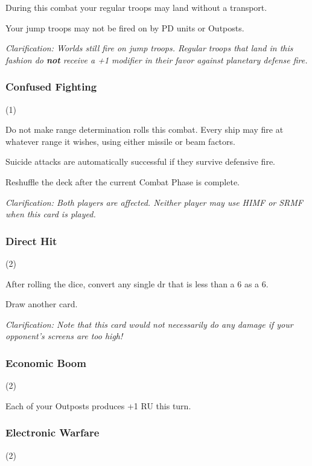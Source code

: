 
During this combat your regular troops may land without a transport.

Your jump troops may not be fired on by PD units or Outposts.

\textit{Clarification: Worlds still fire on jump troops. Regular troops that land in this fashion do \textbf{not} receive a +1 modifier in their favor against planetary defense fire.}

\subsubsection{Confused Fighting} (1)


Do not make range determination rolls this combat. Every ship may fire at whatever range it wishes, using either missile or beam factors.

Suicide attacks are automatically successful if they survive defensive fire.

Reshuffle the deck after the current Combat Phase is complete.

\textit{Clarification: Both players are affected. Neither player may use HIMF or SRMF when this card is played.}

\subsubsection{Direct Hit} (2)


After rolling the dice, convert any single dr that is less than a 6 as a 6.

Draw another card.

\textit{Clarification: Note that this card would not necessarily do any damage if your opponent's screens are too high!}

\subsubsection{Economic Boom} (2)


Each of your Outposts produces +1 RU this turn.

\subsubsection{Electronic Warfare} (2)

